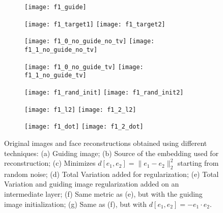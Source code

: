 \documentclass{article}
\def\Emb{e}
\def\Metric{d}
\begin{document}
  \begin{figure}
  \centering
  \captionsetup[subfigure]{labelformat=empty}
  \captionsetup[subfigure]{labelformat=parens}
    \begin{subfigure}{.12\textwidth}
        \centering
        \label{fig:guiding}
        \texttt{[image: f1\_guide]}
        \caption{} %
    \end{subfigure}
    \begin{subfigure}{.14\textwidth}
      \centering
      \texttt{[image: f1\_target1]}
      \texttt{[image: f1\_target2]}
      \caption{} %
      \label{fig:emb1}
    \end{subfigure}
  \captionsetup[subfigure]{labelformat=parens}
  \begin{subfigure}{.14\textwidth}
      \centering
      \texttt{[image: f1\_0\_no\_guide\_no\_tv]}
      \texttt{[image: f1\_1\_no\_guide\_no\_tv]}
      \caption{} %
      \label{fig:noguide_no_tv}
    \end{subfigure}
    \begin{subfigure}{.14\textwidth}
      \centering
      \texttt{[image: f1\_0\_no\_guide\_tv]}
      \texttt{[image: f1\_1\_no\_guide\_tv]}
      \caption{} %
      \label{fig:no_guide_tv}
    \end{subfigure}
    \begin{subfigure}{.14\textwidth}
      \centering
      \texttt{[image: f1\_rand\_init]}
      \texttt{[image: f1\_rand\_init2]}
      \caption{} %
      \label{fig:rand}
    \end{subfigure}
    \begin{subfigure}{.14\textwidth}
      \centering
      \texttt{[image: f1\_l2]}
      \texttt{[image: f1\_2\_l2]}
      \caption{} %
      \label{fig:l2}
    \end{subfigure}
    \begin{subfigure}{.14\textwidth}
      \centering
      \texttt{[image: f1\_dot]}
      \texttt{[image: f1\_2\_dot]}
      \caption{} %
      \label{fig:dot}
    \end{subfigure}
    \caption{Original images and face reconstructions obtained using different techniques:
      (a) Guiding image;
      (b) Source of the embedding used for reconstruction;
      (c) Minimizes $\Metric[\Emb_1,\Emb_2] = \| \Emb_1 - \Emb_2 \|_2^2$ starting from random noise;
      (d) Total Variation added for regularization;
      (e) Total Variation and guiding image regularization added on an intermediate layer;
      (f) Same metric as (e), but with the guiding image initialization;
      (g) Same as (f), but with $\Metric\left[\Emb_1,\Emb_2\right] = - \Emb_1 \cdot \Emb_2$.
    }
  \label{fig:set1}
  \end{figure}
\end{document}
